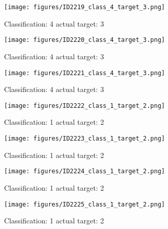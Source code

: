 \begin{figure}[h!]
\begin{center}
\texttt{[image: figures/ID2219\_class\_4\_target\_3.png]}
\end{center}
\caption{ Classification: 4 actual target: 3}
\label{fig:ID2219_class_4_target_3}
\end{figure}
\begin{figure}[h!]
\begin{center}
\texttt{[image: figures/ID2220\_class\_4\_target\_3.png]}
\end{center}
\caption{ Classification: 4 actual target: 3}
\label{fig:ID2220_class_4_target_3}
\end{figure}
\begin{figure}[h!]
\begin{center}
\texttt{[image: figures/ID2221\_class\_4\_target\_3.png]}
\end{center}
\caption{ Classification: 4 actual target: 3}
\label{fig:ID2221_class_4_target_3}
\end{figure}
\begin{figure}[h!]
\begin{center}
\texttt{[image: figures/ID2222\_class\_1\_target\_2.png]}
\end{center}
\caption{ Classification: 1 actual target: 2}
\label{fig:ID2222_class_1_target_2}
\end{figure}
\begin{figure}[h!]
\begin{center}
\texttt{[image: figures/ID2223\_class\_1\_target\_2.png]}
\end{center}
\caption{ Classification: 1 actual target: 2}
\label{fig:ID2223_class_1_target_2}
\end{figure}
\begin{figure}[h!]
\begin{center}
\texttt{[image: figures/ID2224\_class\_1\_target\_2.png]}
\end{center}
\caption{ Classification: 1 actual target: 2}
\label{fig:ID2224_class_1_target_2}
\end{figure}
\begin{figure}[h!]
\begin{center}
\texttt{[image: figures/ID2225\_class\_1\_target\_2.png]}
\end{center}
\caption{ Classification: 1 actual target: 2}
\label{fig:ID2225_class_1_target_2}
\end{figure}
